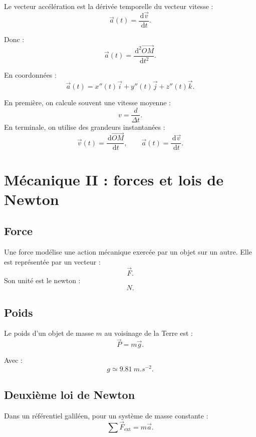 \documentclass[11pt,a4paper]{article}
\newcommand{\dd}{\,\mathrm{d}}
\begin{document}
\begin{definition}
Le vecteur accélération est la dérivée temporelle du vecteur vitesse :
\[
\vec a(t)=\frac{\dd \vec v}{\dd t}.
\]
\end{definition}

Donc :
\[
\vec a(t)=\frac{\dd^2\vec{OM}}{\dd t^2}.
\]

En coordonnées :
\[
\vec a(t)=x''(t)\vec i+y''(t)\vec j+z''(t)\vec k.
\]

\begin{transition}
En première, on calcule souvent une vitesse moyenne :
\[
v=\frac{d}{\Delta t}.
\]
En terminale, on utilise des grandeurs instantanées :
\[
\vec v(t)=\frac{\dd \vec{OM}}{\dd t},
\qquad
\vec a(t)=\frac{\dd \vec v}{\dd t}.
\]
\end{transition}

\section{Mécanique II : forces et lois de Newton}

\subsection{Force}

\begin{definition}
Une force modélise une action mécanique exercée par un objet sur un autre.  
Elle est représentée par un vecteur :
\[
\vec F.
\]
Son unité est le newton :
\[
\si{N}.
\]
\end{definition}

\subsection{Poids}

\begin{definition}
Le poids d'un objet de masse $m$ au voisinage de la Terre est :
\[
\vec P=m\vec g.
\]
\end{definition}

Avec :
\[
g\simeq \SI{9.81}{m.s^{-2}}.
\]

\subsection{Deuxième loi de Newton}

\begin{propriete}
Dans un référentiel galiléen, pour un système de masse constante :
\[
\sum \vec F_{\text{ext}}=m\vec a.
\]
\end{propriete}
\end{document}
